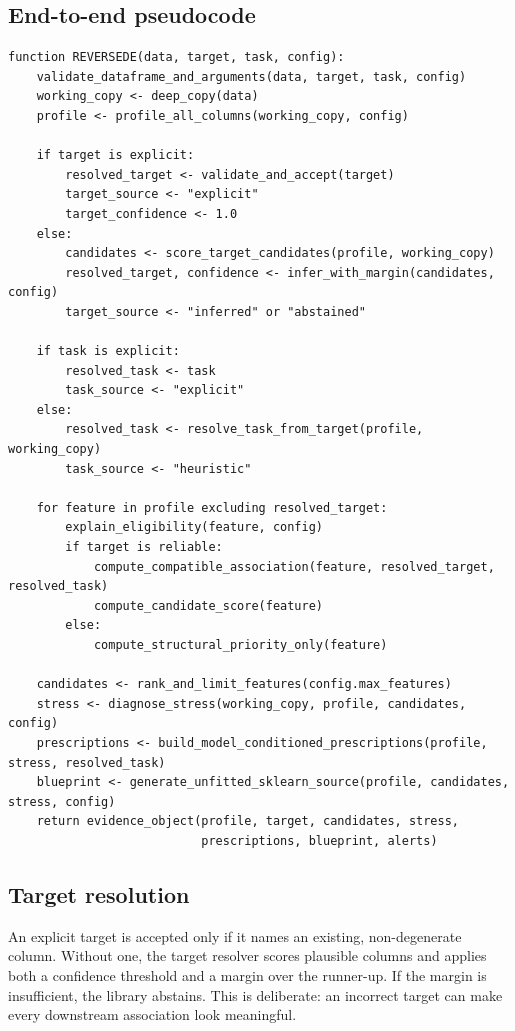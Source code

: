 \documentclass[10pt,a4paper,oneside]{article}
\begin{document}
\subsection{End-to-end pseudocode}
\begin{lstlisting}
function REVERSEDE(data, target, task, config):
    validate_dataframe_and_arguments(data, target, task, config)
    working_copy <- deep_copy(data)
    profile <- profile_all_columns(working_copy, config)

    if target is explicit:
        resolved_target <- validate_and_accept(target)
        target_source <- "explicit"
        target_confidence <- 1.0
    else:
        candidates <- score_target_candidates(profile, working_copy)
        resolved_target, confidence <- infer_with_margin(candidates, config)
        target_source <- "inferred" or "abstained"

    if task is explicit:
        resolved_task <- task
        task_source <- "explicit"
    else:
        resolved_task <- resolve_task_from_target(profile, working_copy)
        task_source <- "heuristic"

    for feature in profile excluding resolved_target:
        explain_eligibility(feature, config)
        if target is reliable:
            compute_compatible_association(feature, resolved_target, resolved_task)
            compute_candidate_score(feature)
        else:
            compute_structural_priority_only(feature)

    candidates <- rank_and_limit_features(config.max_features)
    stress <- diagnose_stress(working_copy, profile, candidates, config)
    prescriptions <- build_model_conditioned_prescriptions(profile, stress, resolved_task)
    blueprint <- generate_unfitted_sklearn_source(profile, candidates, stress, config)
    return evidence_object(profile, target, candidates, stress,
                           prescriptions, blueprint, alerts)
\end{lstlisting}

\subsection{Target resolution}
An explicit target is accepted only if it names an existing, non-degenerate column. Without one,
the target resolver scores plausible columns and applies both a confidence threshold and a margin
over the runner-up. If the margin is insufficient, the library abstains. This is deliberate: an
incorrect target can make every downstream association look meaningful.
\end{document}
